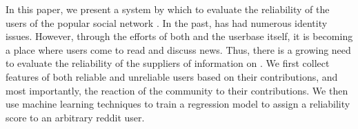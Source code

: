 In this paper, we present a system by which to evaluate the reliability of the
users of the popular social network \reddit{}. In the past, \reddit{} has had
numerous identity issues. However, through the efforts of both \reddit{} and the
userbase itself, it is becoming a place where users come to read and discuss
news. Thus, there is a growing need to evaluate the reliability of the suppliers
of information on \reddit{}. We first collect features of both reliable and
unreliable users based on their contributions, and most importantly, the
reaction of the community to their contributions. We then use machine learning
techniques to train a regression model to assign a reliability score to an
arbitrary reddit user.
